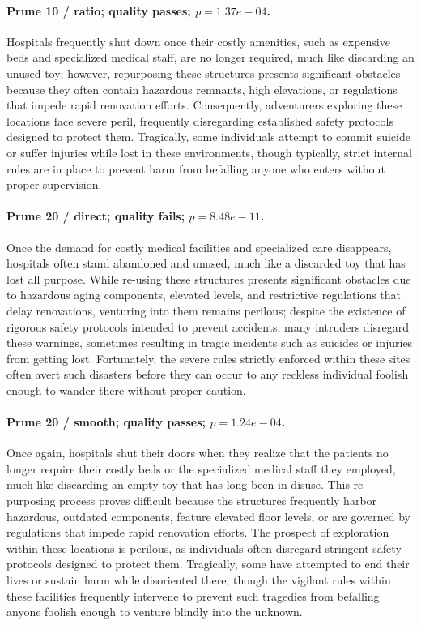 \paragraph{Prune 10 / ratio; quality passes; $p=1.37e-04$.} Hospitals frequently shut down once their costly amenities, such as expensive beds and specialized medical staff, are no longer required, much like discarding an unused toy; however, repurposing these structures presents significant obstacles because they often contain hazardous remnants, high elevations, or regulations that impede rapid renovation efforts. Consequently, adventurers exploring these locations face severe peril, frequently disregarding established safety protocols designed to protect them. Tragically, some individuals attempt to commit suicide or suffer injuries while lost in these environments, though typically, strict internal rules are in place to prevent harm from befalling anyone who enters without proper supervision.

\paragraph{Prune 20 / direct; quality fails; $p=8.48e-11$.} Once the demand for costly medical facilities and specialized care disappears, hospitals often stand abandoned and unused, much like a discarded toy that has lost all purpose. While re-using these structures presents significant obstacles due to hazardous aging components, elevated levels, and restrictive regulations that delay renovations, venturing into them remains perilous; despite the existence of rigorous safety protocols intended to prevent accidents, many intruders disregard these warnings, sometimes resulting in tragic incidents such as suicides or injuries from getting lost. Fortunately, the severe rules strictly enforced within these sites often avert such disasters before they can occur to any reckless individual foolish enough to wander there without proper caution.

\paragraph{Prune 20 / smooth; quality passes; $p=1.24e-04$.} Once again, hospitals shut their doors when they realize that the patients no longer require their costly beds or the specialized medical staff they employed, much like discarding an empty toy that has long been in disuse. This re-purposing process proves difficult because the structures frequently harbor hazardous, outdated components, feature elevated floor levels, or are governed by regulations that impede rapid renovation efforts. The prospect of exploration within these locations is perilous, as individuals often disregard stringent safety protocols designed to protect them. Tragically, some have attempted to end their lives or sustain harm while disoriented there, though the vigilant rules within these facilities frequently intervene to prevent such tragedies from befalling anyone foolish enough to venture blindly into the unknown.

